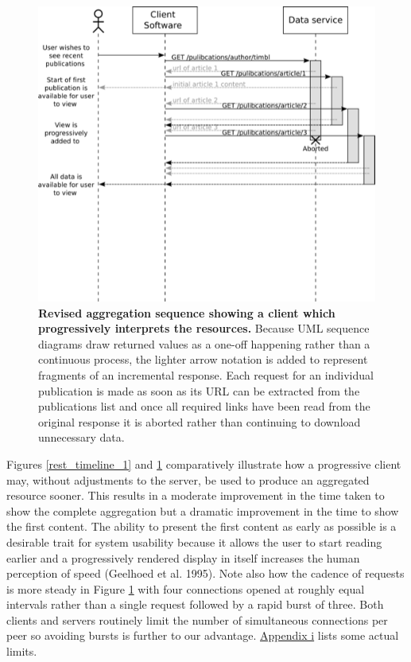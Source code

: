 \documentclass[12pt, ]{article}
\makeatletter
\def\maxwidth{\ifdim\Gin@nat@width>\linewidth\linewidth
\else\Gin@nat@width\fi}
\let\Oldincludegraphics\includegraphics
\renewcommand{\includegraphics}[1]{\Oldincludegraphics[width=\maxwidth]{#1}}
\makeatother
\begin{document}
\begin{figure}[htbp]
\centering
\includegraphics{images/rest_timeline_2.png}
\caption{\textbf{Revised aggregation sequence showing a client which
progressively interprets the resources.} Because UML sequence diagrams
draw returned values as a one-off happening rather than a continuous
process, the lighter arrow notation is added to represent fragments of
an incremental response. Each request for an individual publication is
made as soon as its URL can be extracted from the publications list and
once all required links have been read from the original response it is
aborted rather than continuing to download unnecessary data.
\label{rest_timeline_2}}
\end{figure}

Figures \ref{rest_timeline_1} and \ref{rest_timeline_2} comparatively
illustrate how a progressive client may, without adjustments to the
server, be used to produce an aggregated resource sooner. This results
in a moderate improvement in the time taken to show the complete
aggregation but a dramatic improvement in the time to show the first
content. The ability to present the first content as early as possible
is a desirable trait for system usability because it allows the user to
start reading earlier and a progressively rendered display in itself
increases the human perception of speed (Geelhoed et al. 1995). Note
also how the cadence of requests is more steady in Figure
\ref{rest_timeline_2} with four connections opened at roughly equal
intervals rather than a single request followed by a rapid burst of
three. Both clients and servers routinely limit the number of
simultaneous connections per peer so avoiding bursts is further to our
advantage. \hyperref[appendixux5fhttpux5flimits]{Appendix i} lists some
actual limits.
\end{document}
